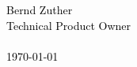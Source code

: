 \newcommand{\cccvname}{Bernd Zuther}
\newcommand{\cccvjobtitle}{Technical Product Owner}

\NoBgThispage
\vspace*{18.5cm}
\noindent
\textcolor{black}{
{\Huge \cccvname}\\[8pt]
{\huge \cccvjobtitle}\\
\\[8pt]
{\today}
}
